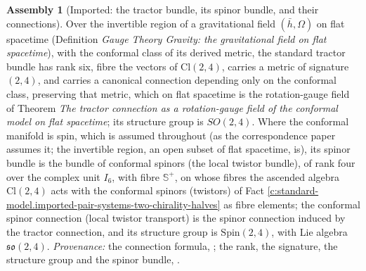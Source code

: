 \documentclass[11pt]{article}
\theoremstyle{definition}
\newtheorem{assembled}[theorem]{Assembly}
\theoremstyle{plain}
\newcommand{\changedmark}[2]{\marginpar{\raggedright\scriptsize\color{#1}#2}}
\providecommand{\CS}{}\renewcommand{\CS}{{\mathbb{S}^{+}}}
\providecommand{\Cl}{}\renewcommand{\Cl}{\mathrm{Cl}}
\providecommand{\hb}{}\renewcommand{\hb}{\bar{h}}
\begin{document}
\begin{assembled}[Imported: the tractor bundle, its spinor bundle, and their connections]\label{c:standard-model.imported-tractor-bundle-spinor-bundle-their}
\changedmark{gray}{reworded}
Over the invertible region of a gravitational field $(\hb, \Omega)$ on flat spacetime (Definition \emph{Gauge Theory Gravity: the gravitational field on flat spacetime}), with the conformal class of its derived metric, the standard tractor bundle has rank six, fibre the vectors of $\Cl(2,4)$, carries a metric of signature $(2,4)$, and carries a canonical connection depending only on the conformal class, preserving that metric, which on flat spacetime is the rotation-gauge field of Theorem \emph{The tractor connection as a rotation-gauge field of the conformal model on flat spacetime}; its structure group is $SO(2,4)$. Where the conformal manifold is spin, which is assumed throughout (as the correspondence paper assumes it; the invertible region, an open subset of flat spacetime, is), its spinor bundle is the bundle of conformal spinors (the local twistor bundle), of rank four over the complex unit $I_6$, with fibre $\CS$, on whose fibres the ascended algebra $\Cl(2,4)$ acts with the conformal spinors (twistors) of Fact \ref{c:standard-model.imported-pair-systems-two-chirality-halves} as fibre elements; the conformal spinor connection (local twistor transport) is the spinor connection induced by the tractor connection, and its structure group is $\mathrm{Spin}(2,4)$, with Lie algebra $\mathfrak{so}(2,4)$. \emph{Provenance:} the connection formula, \cite[Fact~4.1]{ButlerT6}; the rank, the signature, the structure group and the spinor bundle, \cite[Fact~4.9, Prop.~4.10]{ButlerT9}.
\end{assembled}
\end{document}
